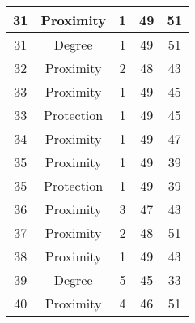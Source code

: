 \documentclass[results.tex]{subfiles}
\begin{document}
\begin{center}
\begin{tabular}{| c || c | c | c | c |}
            \hline
            31                      & Proximity                    & 1                      & 49                      & 51                   \\
            \hline
            31                      & Degree                       & 1                      & 49                      & 51                   \\
            \hline
            32                      & Proximity                    & 2                      & 48                      & 43                   \\
            \hline
            33                      & Proximity                    & 1                      & 49                      & 45                   \\
            \hline
            33                      & Protection                   & 1                      & 49                      & 45                   \\
            \hline
            34                      & Proximity                    & 1                      & 49                      & 47                   \\
            \hline
            35                      & Proximity                    & 1                      & 49                      & 39                   \\
            \hline
            35                      & Protection                   & 1                      & 49                      & 39                   \\
            \hline
            36                      & Proximity                    & 3                      & 47                      & 43                   \\
            \hline
            37                      & Proximity                    & 2                      & 48                      & 51                   \\
            \hline
            38                      & Proximity                    & 1                      & 49                      & 43                   \\
            \hline
            39                      & Degree                       & 5                      & 45                      & 33                   \\
            \hline
            40                      & Proximity                    & 4                      & 46                      & 51                   \\

\end{tabular}
\end{center}
\end{document}

